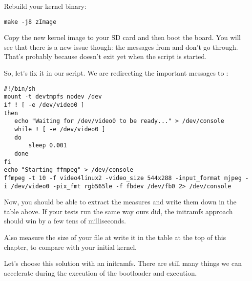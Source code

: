 Rebuild your kernel binary:
\begin{verbatim}
make -j8 zImage
\end{verbatim}

Copy the new kernel image to your SD card and then boot the board. You
will see that there is a new issue though: the messages from 
and  don't go through. That's probably because
 doesn't exit yet when the script is started.

So, let's fix it in our script. We are redirecting the important
messages to :

{\scriptsize
\begin{verbatim}
#!/bin/sh
mount -t devtmpfs nodev /dev
if ! [ -e /dev/video0 ]
then
   echo "Waiting for /dev/video0 to be ready..." > /dev/console
   while ! [ -e /dev/video0 ]
   do
       sleep 0.001
   done
fi
echo "Starting ffmpeg" > /dev/console
ffmpeg -t 10 -f video4linux2 -video_size 544x288 -input_format mjpeg -i /dev/video0 -pix_fmt rgb565le -f fbdev /dev/fb0 2> /dev/console
\end{verbatim}
}

Now, you should be able to extract the measures and write them down in
the table above. If your tests run the same way ours did, the
initramfs approach should win by a few tens of milliseconds.

Also measure the size of your  file at write it in the
table at the top of this chapter, to compare with your initial kernel.

Let's choose this solution with an initramfs. There are still many things we can
accelerate during the execution of the bootloader and execution.
